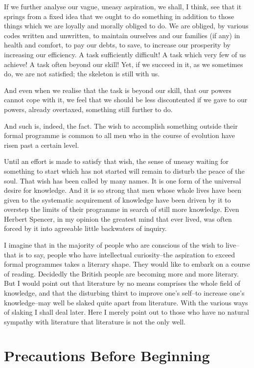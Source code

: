 If we further analyse our vague, uneasy aspiration, we shall, I think,
see that it springs from a fixed idea that we ought to do something in
addition to those things which we are loyally and morally obliged to
do.  We are obliged, by various codes written and unwritten, to
maintain ourselves and our families (if any) in health and comfort, to
pay our debts, to save, to increase our prosperity by increasing our
efficiency.  A task sufficiently difficult!  A task which very few of
us achieve!  A task often beyond our skill! Yet, if we succeed in it,
as we sometimes do, we are not satisfied; the skeleton is still with us.

And even when we realise that the task is beyond our skill, that our
powers cannot cope with it, we feel that we should be less discontented
if we gave to our powers, already overtaxed, something still further to
do.

And such is, indeed, the fact.  The wish to accomplish something
outside their formal programme is common to all men who in the course
of evolution have risen past a certain level.

Until an effort is made to satisfy that wish, the sense of uneasy
waiting for something to start which has not started will remain to
disturb the peace of the soul. That wish has been called by many names.
It is one form of the universal desire for knowledge.  And it is so
strong that men whose whole lives have been given to the systematic
acquirement of knowledge have been driven by it to overstep the limits
of their programme in search of still more knowledge.  Even Herbert
Spencer, in my opinion the greatest mind that ever lived, was often
forced by it into agreeable little backwaters of inquiry.

I imagine that in the majority of people who are conscious of the wish
to live--that is to say, people who have intellectual curiosity--the
aspiration to exceed formal programmes takes a literary shape.  They
would like to embark on a course of reading. Decidedly the British
people are becoming more and more literary. But I would point out that
literature by no means comprises the whole field of knowledge, and that
the disturbing thirst to improve one's self--to increase one's
knowledge--may well be slaked quite apart from literature.  With the
various ways of slaking I shall deal later. Here I merely point out to
those who have no natural sympathy with literature that literature is
not the only well.


\addtocounter{chapter}{1}\chapter*{Precautions Before Beginning}

